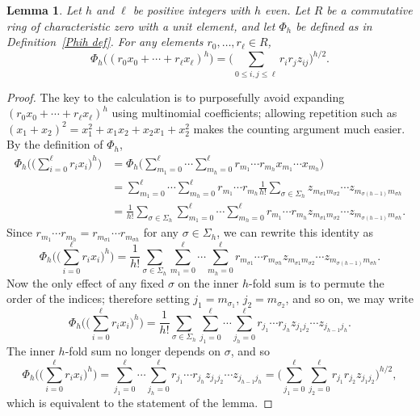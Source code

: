 \documentclass[12pt,reqno]{amsart}
\newtheorem{lemma}[theorem]{Lemma}
\theoremstyle{definition}
\begin{document}
\begin{lemma} \label{monomial function lemma}
Let $h$ and $\ell$ be positive integers with $h$ even. Let $R$ be a commutative ring of characteristic zero with a unit element, and let $\Phi_h$ be defined as in Definition~\ref{Phih def}. For any elements $r_0,\dots,r_\ell\in R$,
\[
\Phi_h\big( (r_0 x_0+\cdots+r_\ell x_\ell)^h \big) = \bigg( \sum_{0\le i, j\le \ell} r_i r_j z_{ij} \bigg)^{h/2}.
\]
\end{lemma}

\begin{proof}
The key to the calculation is to purposefully avoid expanding $(r_0 x_0+\cdots+r_\ell x_\ell)^h$ using multinomial coefficients; allowing repetition such as $(x_1+x_2)^2 = x_1^2 + x_1x_2 + x_2x_1 + x_2^2$ makes the counting argument much easier. By the definition of $\Phi_h$,
\begin{align*}
\Phi_h\bigg( \bigg( \sum_{i=0}^\ell r_i x_i \bigg)^h \bigg) &= \Phi_h\bigg( \sum_{m_1=0}^\ell \cdots \sum_{m_h=0}^\ell r_{m_1} \cdots r_{m_h} x_{m_1} \cdots x_{m_h} \bigg) \\
&= \sum_{m_1=0}^\ell \cdots \sum_{m_h=0}^\ell r_{m_1} \cdots r_{m_h} \frac1{h!} \sum_{\sigma\in\Sigma_h} z_{m_{\sigma1}m_{\sigma2}} \cdots z_{m_{\sigma(h-1)}m_{\sigma h}} \\
&= \frac1{h!} \sum_{\sigma\in\Sigma_h} \sum_{m_1=0}^\ell \cdots \sum_{m_h=0}^\ell r_{m_1} \cdots r_{m_h} z_{m_{\sigma1}m_{\sigma2}} \cdots z_{m_{\sigma(h-1)}m_{\sigma h}}.
\end{align*}
Since $r_{m_1} \cdots r_{m_h} = r_{m_{\sigma1}} \cdots r_{m_{\sigma h}}$ for any $\sigma\in\Sigma_h$, we can rewrite this identity as
\[
\Phi_h\bigg( \bigg( \sum_{i=0}^\ell r_i x_i \bigg)^h \bigg) = \frac1{h!} \sum_{\sigma\in\Sigma_h} \sum_{m_1=0}^\ell \cdots \sum_{m_h=0}^\ell r_{m_{\sigma1}} \cdots r_{m_{\sigma h}} z_{m_{\sigma1}m_{\sigma2}} \cdots z_{m_{\sigma(h-1)}m_{\sigma h}}.
\]
Now the only effect of any fixed $\sigma$ on the inner $h$-fold sum is to permute the order of the indices; therefore setting $j_1=m_{\sigma_1}$, $j_2=m_{\sigma_2}$, and so on, we may write
\[
\Phi_h\bigg( \bigg( \sum_{i=0}^\ell r_i x_i \bigg)^h \bigg) = \frac1{h!} \sum_{\sigma\in\Sigma_h} \sum_{j_1=0}^\ell \cdots \sum_{j_h=0}^\ell r_{j_1} \cdots r_{j_h} z_{j_1j_2} \cdots z_{j_{h-1}j_h}.
\]
The inner $h$-fold sum no longer depends on $\sigma$, and so
\[
\Phi_h\bigg( \bigg( \sum_{i=0}^\ell r_i x_i \bigg)^h \bigg) = \sum_{j_1=0}^\ell \cdots \sum_{j_h=0}^\ell r_{j_1} \cdots r_{j_h} z_{j_1j_2} \cdots z_{j_{h-1}j_h} = \bigg( \sum_{j_1=0}^\ell \sum_{j_2=0}^\ell r_{j_1} r_{j_2} z_{j_1j_2} \bigg)^{h/2},
\]
which is equivalent to the statement of the lemma.
\end{proof}
\end{document}
